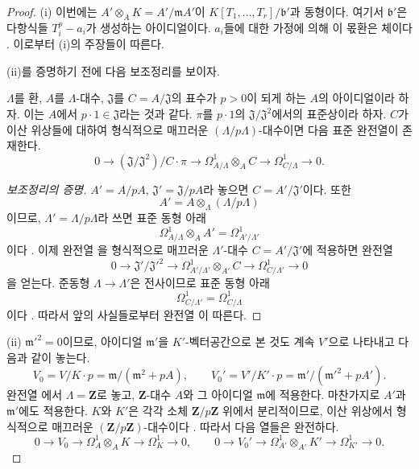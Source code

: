 \begin{proof}
(i) 이번에는 $A'\otimes_AK=A'/\mathfrak mA'$이
$K[T_1,\ldots,T_r]/\mathfrak b'$과 동형이다. 여기서
$\mathfrak b'$은 다항식들 $T_i^p-a_i$가 생성하는 아이디얼이다.
$a_i$들에 대한 가정에 의해 이 몫환은 체이다
. 이로부터 (i)의 주장들이 따른다.

(ii)를 증명하기 전에 다음 보조정리를 보이자.

\begin{lemma}[22.4.4.2]
\label{0.22.4.4.2-ko}
$\Lambda$를 환, $A$를 $\Lambda$-대수, $\mathfrak J$를
$C=A/\mathfrak J$의 표수가 $p>0$이 되게 하는 $A$의 아이디얼이라
하자. 이는 $A$에서 $p\cdot1\in\mathfrak J$라는 것과 같다.
$\pi$를 $p\cdot1$의 $\mathfrak J/\mathfrak J^2$에서의 표준상이라
하자. $C$가 이산 위상들에 대하여 형식적으로 매끄러운
$(\Lambda/p\Lambda)$-대수이면 다음 표준 완전열이 존재한다.
\begin{equation}
\label{0.22.4.4.3-ko}
  0\longrightarrow(\mathfrak J/\mathfrak J^2)/C\cdot\pi
  \longrightarrow\Omega^1_{A/\Lambda}\otimes_AC
  \longrightarrow\Omega^1_{C/\Lambda}\longrightarrow0.
  \tag{22.4.4.3}
\end{equation}
\end{lemma}

\begin{proof}[보조정리의 증명]
$A'=A/pA$, $\mathfrak J'=\mathfrak J/pA$라 놓으면
$C=A'/\mathfrak J'$이다. 또한
\[
  A'=A\otimes_\Lambda(\Lambda/p\Lambda)
\]
이므로, $\Lambda'=\Lambda/p\Lambda$라 쓰면 표준 동형 아래
\[
  \Omega^1_{A/\Lambda}\otimes_AA'
  =\Omega^1_{A'/\Lambda'}
\]
이다 . 이제 완전열 을
형식적으로 매끄러운 $\Lambda'$-대수 $C=A'/\mathfrak J'$에 적용하면
완전열
\[
  0\longrightarrow\mathfrak J'/\mathfrak J'^2
  \longrightarrow\Omega^1_{A'/\Lambda'}\otimes_{A'}C
  \longrightarrow\Omega^1_{C/\Lambda'}\longrightarrow0
\]
을 얻는다. 준동형 $\Lambda\to\Lambda'$은 전사이므로 표준 동형 아래
\[
  \Omega^1_{C/\Lambda'}=\Omega^1_{C/\Lambda}
\]
이다 . 따라서 앞의 사실들로부터 완전열
이 따른다.
\end{proof}

(ii) $\mathfrak m'^2=0$이므로, 아이디얼 $\mathfrak m'$을
$K'$-벡터공간으로 본 것도 계속 $V'$으로 나타내고 다음과 같이 놓는다.
\begin{equation}
\label{0.22.4.4.4-ko}
  V_0=V/K\cdot p=\mathfrak m/(\mathfrak m^2+pA),\qquad
  V_0'=V'/K'\cdot p=\mathfrak m'/(\mathfrak m'^2+pA').
  \tag{22.4.4.4}
\end{equation}
완전열 에서 $\Lambda=\mathbf Z$로 놓고,
$\mathbf Z$-대수 $A$와 그 아이디얼 $\mathfrak m$에 적용한다. 마찬가지로
$A'$과 $\mathfrak m'$에도 적용한다. $K$와 $K'$은 각각 소체
$\mathbf Z/p\mathbf Z$ 위에서 분리적이므로, 이산 위상에서 형식적으로
매끄러운 $(\mathbf Z/p\mathbf Z)$-대수이다 .
따라서 다음 열들은 완전하다.
\begin{equation}
\label{0.22.4.4.5-ko}
  0\longrightarrow V_0\longrightarrow\Omega^1_A\otimes_AK
  \longrightarrow\Omega^1_K\longrightarrow0,\qquad
  0\longrightarrow V_0'\longrightarrow\Omega^1_{A'}\otimes_{A'}K'
  \longrightarrow\Omega^1_{K'}\longrightarrow0.
  \tag{22.4.4.5}
\end{equation}


\end{proof}
